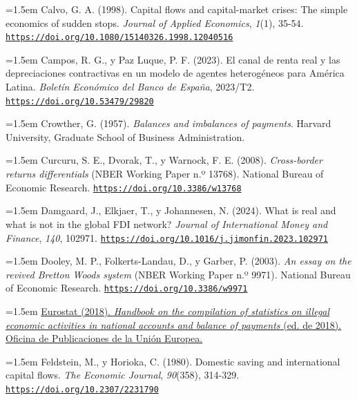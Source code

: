 \documentclass[10pt,a4paper]{article}
\begin{document}
\noindent\hangindent=1.5em Calvo, G. A. (1998). Capital flows and capital-market crises: The simple economics of sudden stops. \textit{Journal of Applied Economics}, \textit{1}(1), 35-54. \href{https://doi.org/10.1080/15140326.1998.12040516}{\nolinkurl{https://doi.org/10.1080/15140326.1998.12040516}}

\noindent\hangindent=1.5em Campos, R. G., y Paz Luque, P. F. (2023). El canal de renta real y las depreciaciones contractivas en un modelo de agentes heterogéneos para América Latina. \textit{Boletín Económico del Banco de España}, 2023/T2. \href{https://doi.org/10.53479/29820}{\nolinkurl{https://doi.org/10.53479/29820}}

\noindent\hangindent=1.5em Crowther, G. (1957). \textit{Balances and imbalances of payments}. Harvard University, Graduate School of Business Administration.

\noindent\hangindent=1.5em Curcuru, S. E., Dvorak, T., y Warnock, F. E. (2008). \textit{Cross-border returns differentials} (NBER Working Paper n.º 13768). National Bureau of Economic Research. \href{https://doi.org/10.3386/w13768}{\nolinkurl{https://doi.org/10.3386/w13768}}

\noindent\hangindent=1.5em Damgaard, J., Elkjaer, T., y Johannesen, N. (2024). What is real and what is not in the global FDI network? \textit{Journal of International Money and Finance}, \textit{140}, 102971. \href{https://doi.org/10.1016/j.jimonfin.2023.102971}{\nolinkurl{https://doi.org/10.1016/j.jimonfin.2023.102971}}

\noindent\hangindent=1.5em Dooley, M. P., Folkerts-Landau, D., y Garber, P. (2003). \textit{An essay on the revived Bretton Woods system} (NBER Working Paper n.º 9971). National Bureau of Economic Research. \href{https://doi.org/10.3386/w9971}{\nolinkurl{https://doi.org/10.3386/w9971}}

\noindent\hangindent=1.5em \href{https://ec.europa.eu/eurostat/web/products-manuals-and-guidelines/-/KS-05-17-202}{Eurostat (2018). \textit{Handbook on the compilation of statistics on illegal economic activities in national accounts and balance of payments} (ed. de 2018). Oficina de Publicaciones de la Unión Europea.}

\noindent\hangindent=1.5em Feldstein, M., y Horioka, C. (1980). Domestic saving and international capital flows. \textit{The Economic Journal}, \textit{90}(358), 314-329. \href{https://doi.org/10.2307/2231790}{\nolinkurl{https://doi.org/10.2307/2231790}}
\end{document}
